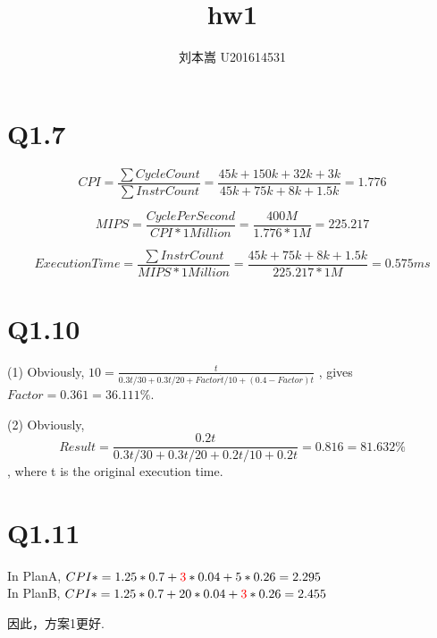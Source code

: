 \documentclass{article}
\begin{document}
\begin{CJK}{UTF8}{gbsn}

\title{hw1}
\author{刘本嵩 U201614531}

\maketitle


\section{Q1.7}
\Large
\smallskip

$$ CPI = \frac{\sum{CycleCount}}{\sum{InstrCount}} = \frac{45k+150k+32k+3k}{45k+75k+8k+1.5k} = 1.776 $$

$$ MIPS = \frac{CyclePerSecond}{CPI * 1Million} = \frac{400M}{1.776 * 1M} = 225.217 $$

$$ ExecutionTime = \frac{\sum{InstrCount}}{MIPS * 1Million} = \frac{45k+75k+8k+1.5k}{225.217 * 1M} = 0.575ms $$

\section{Q1.10}
\Large
\smallskip

(1) Obviously, $ 10 = \frac{t}{0.3t/30 + 0.3t/20 + Factor \dot t / 10 + (0.4-Factor)t} $ , gives $ Factor = 0.361 = 36.111\% $.

(2) Obviously, $$ Result = \frac{0.2t}{0.3t/30 + 0.3t/20 + 0.2t / 10 + 0.2t} = 0.816 = 81.632\% $$ , where t is the original execution time.

\section{Q1.11}
\Large
\smallskip

In PlanA, $ CPI* = 1.25*0.7 + \textcolor{red}{3}*0.04 + 5*0.26 = 2.295 $
\\
In PlanB, $ CPI* = 1.25*0.7 + 20*0.04 + \textcolor{red}{3}*0.26 = 2.455 $

因此，方案1更好.

\end{CJK}
\end{document}
